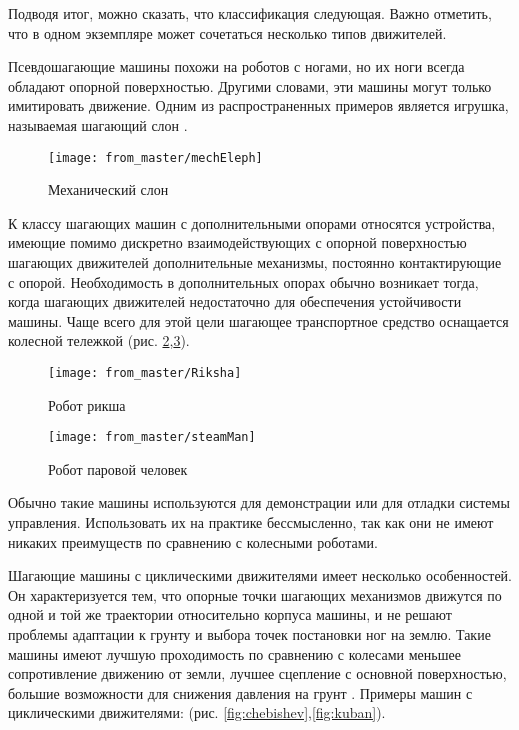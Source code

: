 Подводя итог, можно сказать, что классификация следующая. Важно отметить, что в одном экземпляре может сочетаться несколько типов движителей.

Псевдошагающие машины похожи на роботов с ногами, но их ноги всегда обладают опорной поверхностью. Другими словами, эти машины могут только имитировать движение. Одним из распространенных примеров является игрушка, называемая шагающий слон .


\begin{figure}[H]
\centering\texttt{[image: from\_master/mechEleph]}
\caption{Механический слон}
\label{fig:mechEleph}
\end{figure}

К классу шагающих машин с дополнительными опорами относятся устройства, имеющие помимо дискретно взаимодействующих с опорной поверхностью шагающих движителей дополнительные механизмы, постоянно контактирующие с опорой. Необходимость в дополнительных опорах обычно возникает тогда, когда шагающих движителей недостаточно для обеспечения устойчивости машины. Чаще всего для этой цели шагающее транспортное средство оснащается колесной тележкой (рис. \ref{fig:Riksha},\ref{fig:steamMan})\cite{briskinSintezCiklovogoShagayushchego2011, Petr1986, Brisk2009,2014,2019,Pavl2013}.

\begin{figure}[H]
\centering\texttt{[image: from\_master/Riksha]}
\caption{Робот рикша}
\label{fig:Riksha}
\end{figure}

\begin{figure}[H]
\centering\texttt{[image: from\_master/steamMan]}
\caption{Робот паровой человек}
\label{fig:steamMan}
\end{figure}

Обычно такие машины используются для демонстрации или для отладки системы управления. Использовать их на практике бессмысленно, так как они не имеют никаких преимуществ по сравнению с колесными роботами.

Шагающие машины с циклическими движителями имеет несколько особенностей. Он характеризуется тем, что опорные точки шагающих механизмов движутся по одной и той же траектории относительно корпуса машины, и не решают проблемы адаптации к грунту и выбора точек постановки ног на землю. Такие машины имеют лучшую проходимость по сравнению с колесами меньшее сопротивление движению от земли, лучшее сцепление с основной поверхностью, большие возможности для снижения давления на грунт \cite{cruse2001control}. Примеры машин с циклическими движителями: (рис. \ref{fig:chebishev},\ref{fig:kuban}).

